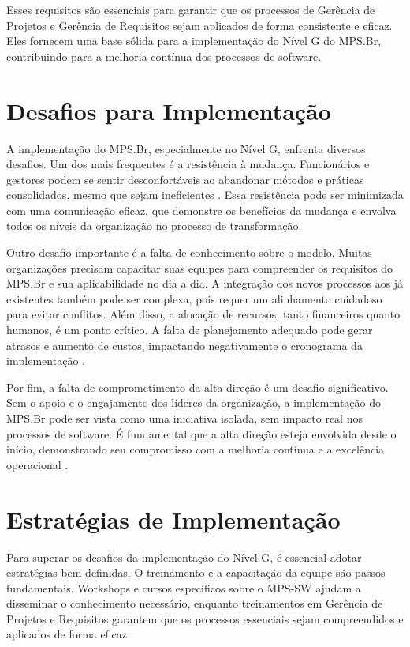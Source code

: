 \documentclass[
	12pt,				%
	oneside,			%
	a4paper,			%
	english,			%
	brazil				%
	]{abntex2unama}
\begin{document}
Esses requisitos são essenciais para garantir que os processos de Gerência de Projetos e Gerência de Requisitos sejam aplicados de forma consistente e eficaz. Eles fornecem uma base sólida para a implementação do Nível G do MPS.Br, contribuindo para a melhoria contínua dos processos de software.

\chapter{Desafios para Implementação}
A implementação do MPS.Br, especialmente no Nível G, enfrenta diversos desafios. Um dos mais frequentes é a resistência à mudança. Funcionários e gestores podem se sentir desconfortáveis ao abandonar métodos e práticas consolidados, mesmo que sejam ineficientes \cite{change_management}. Essa resistência pode ser minimizada com uma comunicação eficaz, que demonstre os benefícios da mudança e envolva todos os níveis da organização no processo de transformação.

Outro desafio importante é a falta de conhecimento sobre o modelo. Muitas organizações precisam capacitar suas equipes para compreender os requisitos do MPS.Br e sua aplicabilidade no dia a dia. A integração dos novos processos aos já existentes também pode ser complexa, pois requer um alinhamento cuidadoso para evitar conflitos. Além disso, a alocação de recursos, tanto financeiros quanto humanos, é um ponto crítico. A falta de planejamento adequado pode gerar atrasos e aumento de custos, impactando negativamente o cronograma da implementação \cite{resource_allocation}.

Por fim, a falta de comprometimento da alta direção é um desafio significativo. Sem o apoio e o engajamento dos líderes da organização, a implementação do MPS.Br pode ser vista como uma iniciativa isolada, sem impacto real nos processos de software. É fundamental que a alta direção esteja envolvida desde o início, demonstrando seu compromisso com a melhoria contínua e a excelência operacional \cite{leadership_commitment}.

\chapter{Estratégias de Implementação}
Para superar os desafios da implementação do Nível G, é essencial adotar estratégias bem definidas. O treinamento e a capacitação da equipe são passos fundamentais. Workshops e cursos específicos sobre o MPS-SW ajudam a disseminar o conhecimento necessário, enquanto treinamentos em Gerência de Projetos e Requisitos garantem que os processos essenciais sejam compreendidos e aplicados de forma eficaz \cite{training}.
\end{document}
